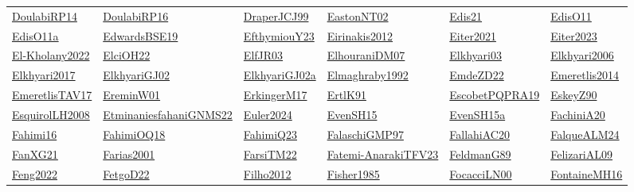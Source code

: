 \begin{longtable}{*{6}{l}}
\hyperref[detail:DoulabiRP14]{DoulabiRP14} & \hyperref[detail:DoulabiRP16]{DoulabiRP16} & \hyperref[detail:DraperJCJ99]{DraperJCJ99} & \hyperref[detail:EastonNT02]{EastonNT02} & \hyperref[detail:Edis21]{Edis21} & \hyperref[detail:EdisO11]{EdisO11}\\ 
\hyperref[detail:EdisO11a]{EdisO11a} & \hyperref[detail:EdwardsBSE19]{EdwardsBSE19} & \hyperref[detail:EfthymiouY23]{EfthymiouY23} & \hyperref[detail:Eirinakis2012]{Eirinakis2012} & \hyperref[detail:Eiter2021]{Eiter2021} & \hyperref[detail:Eiter2023]{Eiter2023}\\ 
\hyperref[detail:El-Kholany2022]{El-Kholany2022} & \hyperref[detail:ElciOH22]{ElciOH22} & \hyperref[detail:ElfJR03]{ElfJR03} & \hyperref[detail:ElhouraniDM07]{ElhouraniDM07} & \hyperref[detail:Elkhyari03]{Elkhyari03} & \hyperref[detail:Elkhyari2006]{Elkhyari2006}\\ 
\hyperref[detail:Elkhyari2017]{Elkhyari2017} & \hyperref[detail:ElkhyariGJ02]{ElkhyariGJ02} & \hyperref[detail:ElkhyariGJ02a]{ElkhyariGJ02a} & \hyperref[detail:Elmaghraby1992]{Elmaghraby1992} & \hyperref[detail:EmdeZD22]{EmdeZD22} & \hyperref[detail:Emeretlis2014]{Emeretlis2014}\\ 
\hyperref[detail:EmeretlisTAV17]{EmeretlisTAV17} & \hyperref[detail:EreminW01]{EreminW01} & \hyperref[detail:ErkingerM17]{ErkingerM17} & \hyperref[detail:ErtlK91]{ErtlK91} & \hyperref[detail:EscobetPQPRA19]{EscobetPQPRA19} & \hyperref[detail:EskeyZ90]{EskeyZ90}\\ 
\hyperref[detail:EsquirolLH2008]{EsquirolLH2008} & \hyperref[detail:EtminaniesfahaniGNMS22]{EtminaniesfahaniGNMS22} & \hyperref[detail:Euler2024]{Euler2024} & \hyperref[detail:EvenSH15]{EvenSH15} & \hyperref[detail:EvenSH15a]{EvenSH15a} & \hyperref[detail:FachiniA20]{FachiniA20}\\ 
\hyperref[detail:Fahimi16]{Fahimi16} & \hyperref[detail:FahimiOQ18]{FahimiOQ18} & \hyperref[detail:FahimiQ23]{FahimiQ23} & \hyperref[detail:FalaschiGMP97]{FalaschiGMP97} & \hyperref[detail:FallahiAC20]{FallahiAC20} & \hyperref[detail:FalqueALM24]{FalqueALM24}\\ 
\hyperref[detail:FanXG21]{FanXG21} & \hyperref[detail:Farias2001]{Farias2001} & \hyperref[detail:FarsiTM22]{FarsiTM22} & \hyperref[detail:Fatemi-AnarakiTFV23]{Fatemi-AnarakiTFV23} & \hyperref[detail:FeldmanG89]{FeldmanG89} & \hyperref[detail:FelizariAL09]{FelizariAL09}\\ 
\hyperref[detail:Feng2022]{Feng2022} & \hyperref[detail:FetgoD22]{FetgoD22} & \hyperref[detail:Filho2012]{Filho2012} & \hyperref[detail:Fisher1985]{Fisher1985} & \hyperref[detail:FocacciLN00]{FocacciLN00} & \hyperref[detail:FontaineMH16]{FontaineMH16}\\ 

\end{longtable}
